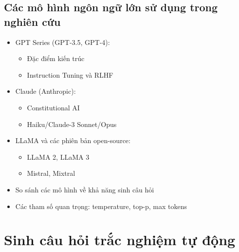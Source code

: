 \subsection{Các mô hình ngôn ngữ lớn sử dụng trong nghiên cứu}
\begin{itemize}
    \item GPT Series (GPT-3.5, GPT-4):
    \begin{itemize}
        \item Đặc điểm kiến trúc
        \item Instruction Tuning và RLHF
        \end{itemize}
    \item Claude (Anthropic):
    \begin{itemize}
        \item Constitutional AI
        \item Haiku/Claude-3 Sonnet/Opus
    \end{itemize}
    \item LLaMA và các phiên bản open-source:
    \begin{itemize}
        \item LLaMA 2, LLaMA 3
        \item Mistral, Mixtral
    \end{itemize}
    \item So sánh các mô hình về khả năng sinh câu hỏi
    \item Các tham số quan trọng: temperature, top-p, max tokens
\end{itemize}

\section{Sinh câu hỏi trắc nghiệm tự động}

